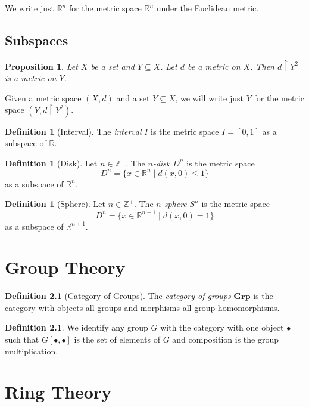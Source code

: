 \documentclass{book}
\newtheorem{proposition}[lemma]{Proposition}
\theoremstyle{definition}
\newtheorem{definition}[lemma]{Definition}
\newcommand{\Real}{\ensuremath{\mathbb{R}}}
\begin{document}
We write just $\Real^n$ for the metric space $\Real^n$ under the Euclidean metric.

\section{Subspaces}

\begin{proposition}
    Let $X$ be a set and $Y \subseteq X$. Let $d$ be a metric on $X$. Then $d \restriction Y^2$ is a metric on $Y$.
\end{proposition}

Given a metric space $(X,d)$ and a set $Y \subseteq X$, we will write just $Y$ for the metric space $(Y, d \restriction Y^2)$.

\begin{definition}[Interval]
    The \emph{interval} $I$ is the metric space $I = [0,1]$ as a subspace of $\Real$.
\end{definition}

\begin{definition}[Disk]
    Let $n \in \mathbb{Z}^+$. The \emph{$n$-disk} $D^n$ is the metric space
    \[ D^n = \{ x \in \Real^n \mid d(x,0) \leq 1 \} \]
    as a subspace of $\Real^n$.
\end{definition}

\begin{definition}[Sphere]
    Let $n \in \mathbb{Z}^+$. The \emph{$n$-sphere} $S^n$ is the metric space
    \[ D^n = \{ x \in \Real^{n+1} \mid d(x,0) = 1 \} \]
    as a subspace of $\Real^{n+1}$.
\end{definition}

\chapter{Group Theory}

\begin{definition}[Category of Groups]
    The \emph{category of groups} $\mathbf{Grp}$ is the category with objects all groups and morphisms all group homomorphisms.
\end{definition}

\begin{definition}
    We identify any group $G$ with the category with one object $\bullet$ such that $G[\bullet,\bullet]$ is the set of elements
    of $G$ and composition is the group multiplication.
\end{definition}

\chapter{Ring Theory}
\end{document}
